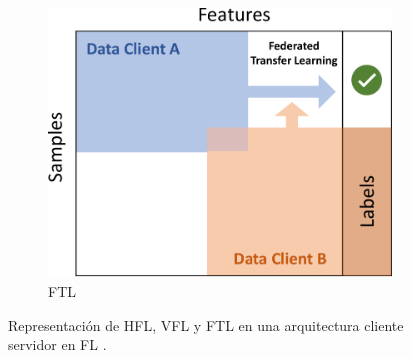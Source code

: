 \begin{itemize}
\begin{figure}[h!]
        \hfill
        \vspace{3mm}
        
        \begin{subfigure}[]{0.3\textwidth}
            \includegraphics[width=0.95\linewidth]{figuras/ftl.pdf}
            \caption{\ac{FTL}}
            \label{fig:third}
        \end{subfigure}
        \caption{Representación de \ac{HFL}, \ac{VFL} y \ac{FTL} en una arquitectura cliente servidor en \ac{FL} \cite{yang-2019}.}
        \label{fig:architectures}
    \end{figure}


\end{itemize}
